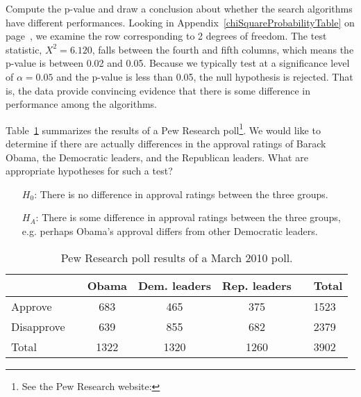 \begin{example}{Compute the p-value and draw a conclusion about whether the search algorithms have different performances.}
Looking in Appendix~\ref{chiSquareProbabilityTable} on page~\pageref{chiSquareProbabilityTable}, we examine the row corresponding to 2 degrees of freedom. The test statistic, $X^2=6.120$, falls between the fourth and fifth columns, which means the p-value is between 0.02 and 0.05. Because we typically test at a significance level of $\alpha=0.05$ and the p-value is less than 0.05, the null hypothesis is rejected. That is, the data provide convincing evidence that there is some difference in performance among the algorithms.
\end{example}

\begin{example}{Table~\ref{pewResearchPollOnApprovalRatingsForChiSquareSectionExampleAndExercises} summarizes the results of a Pew Research poll\footnote{See the Pew Research website: {\scriptsize{}}}. We would like to determine if there are actually differences in the approval ratings of Barack Obama, the Democratic leaders, and the Republican leaders. What are appropriate hypotheses for such a test?}\label{hypothesisTestSetupForPewResearchPollOnApprovalRatingsForChiSquareSection}
\begin{itemize}
\item[$H_0$:] There is no difference in approval ratings between the three groups.
\item[$H_A$:] There is some difference in approval ratings between the three groups, e.g. perhaps Obama's approval differs from other Democratic leaders.
\end{itemize}
\end{example}
\begin{table}
\centering
\begin{tabular}{ll ccc ll}
\hline
 & \hspace{1mm} & Obama & Dem. leaders & Rep. leaders & \hspace{1mm} & Total \\
\hline
Approve				   & & 683    & 465 & 375   & 				& 1523 \\
Disapprove			   & & 639    & 855 & 682   &				& 2379 \\
\hline
Total					   & & 1322    & 1320 & 1260 & 				& 3902 \\
\hline
\end{tabular}
\caption{Pew Research poll results of a March 2010 poll.}
\label{pewResearchPollOnApprovalRatingsForChiSquareSectionExampleAndExercises}
\end{table}

